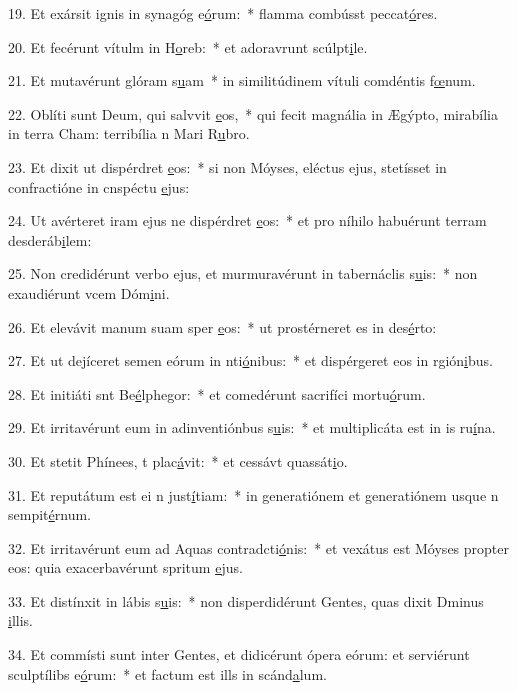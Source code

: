 19. Et exársit ignis in synagóg e\uline{ó}rum:~* flamma combússt peccat\uline{ó}res.\par 
20. Et fecérunt vítulm in H\uline{o}reb:~* et adoravrunt scúlpt\uline{i}le.\par 
21. Et mutavérunt glóram s\uline{u}am~* in similitúdinem vítuli comdéntis f\uline{œ}num.\par 
22. Oblíti sunt Deum, qui salvvit \uline{e}os,~* qui fecit magnália in Ægýpto, mirabília in terra Cham: terribília n Mari R\uline{u}bro.\par 
23. Et dixit ut dispérdret \uline{e}os:~* si non Móyses, eléctus ejus, stetísset in confractióne in cnspéctu \uline{e}jus:\par 
24. Ut avérteret iram ejus ne dispérdret \uline{e}os:~* et pro níhilo habuérunt terram desderáb\uline{i}lem:\par 
25. Non credidérunt verbo ejus, et murmuravérunt in tabernáclis s\uline{u}is:~* non exaudiérunt vcem Dóm\uline{i}ni.\par 
26. Et elevávit manum suam sper \uline{e}os:~* ut prostérneret es in des\uline{é}rto:\par 
27. Et ut dejíceret semen eórum in nti\uline{ó}nibus:~* et dispérgeret eos in rgión\uline{i}bus.\par 
28. Et initiáti snt Be\uline{é}lphegor:~* et comedérunt sacrifíci mortu\uline{ó}rum.\par 
29. Et irritavérunt eum in adinventiónbus s\uline{u}is:~* et multiplicáta est in is ru\uline{í}na.\par 
30. Et stetit Phínees, t plac\uline{á}vit:~* et cessávt quassát\uline{i}o.\par 
31. Et reputátum est ei n just\uline{í}tiam:~* in generatiónem et generatiónem usque n sempit\uline{é}rnum.\par 
32. Et irritavérunt eum ad Aquas contradcti\uline{ó}nis:~* et vexátus est Móyses propter eos: quia exacerbavérunt spritum \uline{e}jus.\par 
33. Et distínxit in lábis s\uline{u}is:~* non disperdidérunt Gentes, quas dixit Dminus \uline{i}llis.\par 
34. Et commísti sunt inter Gentes, et didicérunt ópera eórum: et serviérunt sculptílibs e\uline{ó}rum:~* et factum est ills in scánd\uline{a}lum.\par 

